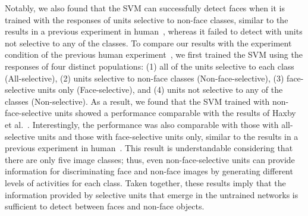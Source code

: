 \documentclass[sn-mathphys]{sn-jnl}%
\theoremstyle{thmstyleone}%
\theoremstyle{thmstyletwo}%
\theoremstyle{thmstylethree}%
\begin{document}
Notably, we also found that the SVM can successfully detect faces when it is trained with the responses of units selective to non-face classes, 
similar to the results in a previous experiment in human~\cite{haxby2001distributed},
whereas it failed to detect with units not selective to any of the classes.
To compare our results with the experiment condition of the previous human experiment~\cite{haxby2001distributed},
we first trained the SVM using the responses of four distinct populations:
(1) all of the units selective to each class (All-selective),
(2) units selective to non-face classes (Non-face-selective),
(3) face-selective units only (Face-selective),
and (4) units not selective to any of the classes (Non-selective).
As a result, we found that the SVM trained with non-face-selective units showed a performance comparable with the results of Haxby et al.~\cite{haxby2001distributed}.
Interestingly, the performance was also comparable with those with all-selective units and those with face-selective units only,
similar to the results in a previous experiment in human~\cite{haxby2001distributed}.
This result is understandable considering that there are only five image classes;
thus, even non-face-selective units can provide information for discriminating face and non-face images by generating different levels of activities for each class.
Taken together, these results imply that the information provided by selective units that emerge in the untrained networks is sufficient to detect between faces and non-face objects.
\end{document}
